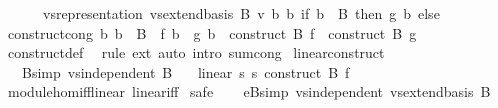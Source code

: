 \begin{isabellebody}
\ \ \ \ \ \ vs{}{\isachardot}{\kern0pt}representation\ {\isacharparenleft}{\kern0pt}vs{}{\isachardot}{\kern0pt}extend{\isacharunderscore}{\kern0pt}basis\ B{\isacharparenright}{\kern0pt}\ v\ b\ {\isacharasterisk}{\kern0pt}b\ {\isacharparenleft}{\kern0pt}if\ b\ {\isasymin}\ B\ then\ g\ b\ else\ {}{\isacharparenright}{\kern0pt}{\isacharparenright}{\kern0pt}{\isachardoublequoteclose}\isanewline
\isanewline
{}\isamarkupfalse%
\ construct{\isacharunderscore}{\kern0pt}cong{\isacharcolon}{\kern0pt}\ {\isachardoublequoteopen}{\isacharparenleft}{\kern0pt}{\isasymAnd}b{\isachardot}{\kern0pt}\ b\ {\isasymin}\ B\ {\isasymLongrightarrow}\ f\ b\ {\isacharequal}{\kern0pt}\ g\ b{\isacharparenright}{\kern0pt}\ {\isasymLongrightarrow}\ construct\ B\ f\ {\isacharequal}{\kern0pt}\ construct\ B\ g{\isachardoublequoteclose}\isanewline
%
\isadelimproof
\ \ %
\endisadelimproof
%
\isatagproof
{}\isamarkupfalse%
\ construct{\isacharunderscore}{\kern0pt}def\ \isamarkupfalse%
\ {\isacharparenleft}{\kern0pt}rule\ ext{\isacharcomma}{\kern0pt}\ auto\ intro{\isacharbang}{\kern0pt}{\isacharcolon}{\kern0pt}\ sum{\isachardot}{\kern0pt}cong{\isacharparenright}{\kern0pt}%
\endisatagproof
{\isafoldproof}%
%
\isadelimproof
\isanewline
%
\endisadelimproof
\isanewline
{}\isamarkupfalse%
\ linear{\isacharunderscore}{\kern0pt}construct{\isacharcolon}{\kern0pt}\isanewline
\ \ \ B{\isacharbrackleft}{\kern0pt}simp{\isacharbrackright}{\kern0pt}{\isacharcolon}{\kern0pt}\ {\isachardoublequoteopen}vs{}{\isachardot}{\kern0pt}independent\ B{\isachardoublequoteclose}\isanewline
\ \ \ {\isachardoublequoteopen}linear\ s{}\ s{}\ {\isacharparenleft}{\kern0pt}construct\ B\ f{\isacharparenright}{\kern0pt}{\isachardoublequoteclose}\isanewline
%
\isadelimproof
\ \ %
\endisadelimproof
%
\isatagproof
{}\isamarkupfalse%
\ module{\isacharunderscore}{\kern0pt}hom{\isacharunderscore}{\kern0pt}iff{\isacharunderscore}{\kern0pt}linear\ linear{\isacharunderscore}{\kern0pt}iff\isanewline
{}\isamarkupfalse%
\ safe\isanewline
\ \ \isamarkupfalse%
\ eB{\isacharbrackleft}{\kern0pt}simp{\isacharbrackright}{\kern0pt}{\isacharcolon}{\kern0pt}\ {\isachardoublequoteopen}vs{}{\isachardot}{\kern0pt}independent\ {\isacharparenleft}{\kern0pt}vs{}{\isachardot}{\kern0pt}extend{\isacharunderscore}{\kern0pt}basis\ B{\isacharparenright}{\kern0pt}{\isachardoublequoteclose}\isanewline
\ \ \ \ \isamarkupfalse%

\end{isabellebody}

